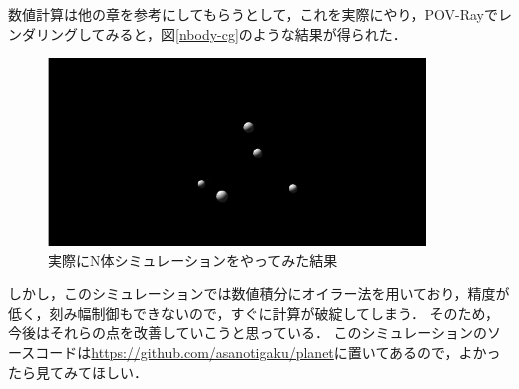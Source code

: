 \newpage
数値計算は他の章を参考にしてもらうとして，これを実際にやり，POV-Rayでレンダリングしてみると，図\ref{nbody-cg}のような結果が得られた．
\begin{figure}
\centering
\includegraphics[width=10cm]{img/nbody-cg.png}
\caption{実際にN体シミュレーションをやってみた結果}
\end{figure}
しかし，このシミュレーションでは数値積分にオイラー法を用いており，精度が低く，刻み幅制御もできないので，すぐに計算が破綻してしまう．
そのため，今後はそれらの点を改善していこうと思っている．
このシミュレーションのソースコードは\url{https://github.com/asanotigaku/planet}に置いてあるので，よかったら見てみてほしい．
